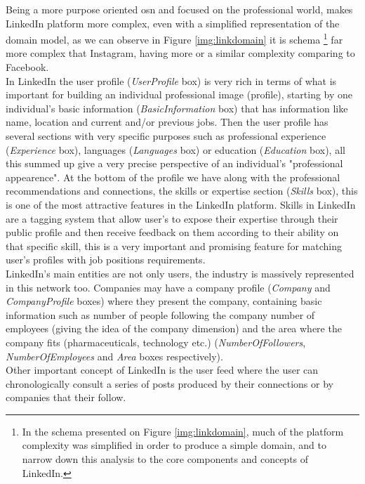 \indent Being a more purpose oriented \gls{osn} and focused on the professional
world, makes LinkedIn platform more complex, even with a simplified representation of the domain model, as we can observe in Figure \ref{img:linkdomain} it is schema
\footnote{\indent In the schema presented on Figure \ref{img:linkdomain}, much of the platform complexity was simplified in order to produce a simple domain, and to narrow
down this analysis to the core components and concepts of LinkedIn.}
far more complex that Instagram, having more or a similar complexity comparing to Facebook.\\
\indent In LinkedIn the user profile (\textit{UserProfile} box) is very rich in terms of what is important for building an individual professional image (profile),
starting by one individual's basic information (\textit{BasicInformation} box) that has information like name, location and current and/or previous jobs. Then
the user profile has several sections with very specific purposes such as professional experience (\textit{Experience} box), languages (\textit{Languages} box) or
education (\textit{Education} box), all this summed up give a very precise perspective of an individual's "professional appearence". At the bottom of the profile
we have along with the professional recommendations and connections, the skills or expertise section (\textit{Skills} box), this is one of the most attractive features
in the LinkedIn platform. Skills in LinkedIn are a tagging system that allow user's to expose their expertise through their public profile and then receive feedback
on them according to their ability on that specific skill, this is a very important and promising feature for matching user's profiles with
job positions requirements.\\
\indent LinkedIn's main entities are not only users, the industry is massively represented in this network too. Companies may have a company profile
(\textit{Company} and \textit{CompanyProfile} boxes) where they present the company, containing basic information such as number of people following the company
number of employees (giving the idea of the company dimension) and the area where the company fits (pharmaceuticals, technology etc.) (\textit{NumberOfFollowers},
\textit{NumberOfEmployees} and \textit{Area} boxes respectively).\\
\indent Other important concept of LinkedIn is the user feed where the user can chronologically consult a series of posts produced by their connections
or by companies that their follow.

